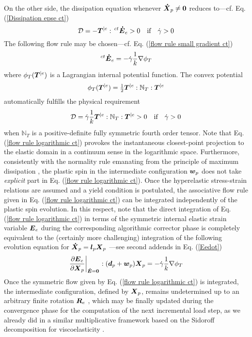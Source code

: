 \documentclass[preprint,review,12pt,sort&compress]{elsarticle}%
\newcommand{\edo}[0]{\scriptsize\mathbf{\dot E} = \mathbf{0}\normalsize\mathbf{}}
\renewcommand{\mathbf}[1]{\mbox{\boldmath $#1$ \unboldmath}  \!\!}
\begin{document}
On the other side, the dissipation equation whenever $\mathbf{\dot{X}}_{p}%
\neq\mathbf{0}$ reduces to---cf. Eq. (\ref{Dissipation epse ct})%
\begin{equation}
\mathcal{D}=-\mathbf{T}^{|e}:\,^{ct}\mathbf{\dot{E}}_{e}>0\quad\text{if}%
\quad\dot{\gamma}>0 \label{DissipationEe}%
\end{equation}
The following flow rule may be chosen---cf. Eq.
(\ref{flow rule small gradient ct})%
\begin{equation}
\,^{ct}\mathbf{\dot{E}}_{e}=-\dot{\gamma}\frac{1}{k}\mathbb{\nabla}\phi_{T}
\label{flow rule logarithmic ct}%
\end{equation}
where $\phi_{T}(\mathbf{T}^{|e})$ is a Lagrangian internal potential function.
The convex potential%
\begin{equation}
\phi_{T}(\mathbf{T}^{|e})=\tfrac{1}{2}\mathbf{T}^{|e}:\mathbb{N}%
_{T}:\mathbf{T}^{|e}%
\end{equation}
automatically fulfills the physical requirement%
\begin{equation}
\mathcal{D}=\dot{\gamma}\frac{1}{k}\mathbf{T}^{|e}:\mathbb{N}_{T}%
:\mathbf{T}^{|e}>0\quad\text{if}\quad\dot{\gamma}>0 \label{Dissipation Te}%
\end{equation}
when $\mathbb{N}_{T}$ is a positive-definite fully symmetric fourth order
tensor. Note that Eq. (\ref{flow rule logarithmic ct}) provokes the
instantaneous closest-point projection to the elastic domain in a continuum
sense in the logarithmic space. Furthermore, consistently with the normality
rule emanating from the principle of maximum dissipation \cite{Lubliner86},
the plastic spin in the intermediate configuration $\mathbf{w}_{p}$ does not
take \emph{explicit} part in Eq. (\ref{flow rule logarithmic ct}). Once the
hyperelastic stress-strain relations are assumed and a yield condition is
postulated, the associative flow rule given in Eq.
(\ref{flow rule logarithmic ct}) can be integrated independently of the
plastic spin evolution. In this respect, note that the direct integration of
Eq. (\ref{flow rule logarithmic ct}) in terms of the symmetric internal
elastic strain variable $\mathbf{E}_{e}$ during the corresponding algorithmic
corrector phase is completely equivalent to the (certainly more challenging)
integration of the following evolution equation for $\mathbf{\dot{X}}%
_{p}=\mathbf{l}_{p}\mathbf{X}_{p}$ ---see second addends in Eq. (\ref{Eedot})%
\begin{equation}
\left.  \frac{\partial\mathbf{E}_{e}}{\partial\mathbf{X}_{p}}\right\vert _{%
\edo
}:(\mathbf{d}_{p}+\mathbf{w}_{p})\mathbf{X}_{p}=-\dot{\gamma}\frac{1}%
{k}\mathbb{\nabla}\phi_{T}%
\end{equation}
Once the symmetric flow given by Eq. (\ref{flow rule logarithmic ct}) is
integrated, the intermediate configuration, defined by $\mathbf{X}_{p}$,
remains undetermined up to an arbitrary finite rotation $\mathbf{R}_{e}$
\cite{Simo88}, which may be finally updated during the convergence phase for
the computation of the next incremental load step, as we already did in a
similar multiplicative framework based on the Sidoroff decomposition for
viscoelasticity \cite{LatMonCM2015}.
\end{document}
